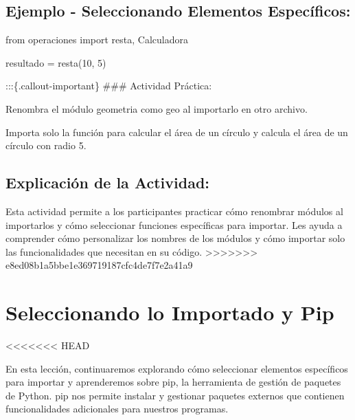 \documentclass[
  a4paper,
  DIV=11,
  numbers=noendperiod,
  onepage,
  openany]{scrreprt}
\newenvironment{Shaded}{\begin{snugshade}}{\end{snugshade}}
\newcommand{\DecValTok}[1]{\textcolor[rgb]{0.68,0.00,0.00}{#1}}
\newcommand{\ImportTok}[1]{\textcolor[rgb]{0.00,0.46,0.62}{#1}}
\newcommand{\NormalTok}[1]{\textcolor[rgb]{0.00,0.23,0.31}{#1}}
\newcommand{\OperatorTok}[1]{\textcolor[rgb]{0.37,0.37,0.37}{#1}}
\begin{document}
\hypertarget{ejemplo---seleccionando-elementos-especuxedficos-1}{%
\section{Ejemplo - Seleccionando Elementos
Específicos:}\label{ejemplo---seleccionando-elementos-especuxedficos-1}}

\begin{Shaded}
\begin{Highlighting}[]
\ImportTok{from}\NormalTok{ operaciones }\ImportTok{import}\NormalTok{ resta, Calculadora}

\NormalTok{resultado }\OperatorTok{=}\NormalTok{ resta(}\DecValTok{10}\NormalTok{, }\DecValTok{5}\NormalTok{)}
\end{Highlighting}
\end{Shaded}

:::\{.callout-important\} \#\#\# Actividad Práctica:

Renombra el módulo geometria como geo al importarlo en otro archivo.

Importa solo la función para calcular el área de un círculo y calcula el
área de un círculo con radio 5.

\hypertarget{explicaciuxf3n-de-la-actividad-61}{%
\section{Explicación de la
Actividad:}\label{explicaciuxf3n-de-la-actividad-61}}

Esta actividad permite a los participantes practicar cómo renombrar
módulos al importarlos y cómo seleccionar funciones específicas para
importar. Les ayuda a comprender cómo personalizar los nombres de los
módulos y cómo importar solo las funcionalidades que necesitan en su
código.
\textgreater\textgreater\textgreater\textgreater\textgreater\textgreater\textgreater{}
e8ed08b1a5bbe1e369719187cfc4de7f7e2a41a9

\hypertarget{seleccionando-lo-importado-y-pip}{%
\chapter{Seleccionando lo Importado y
Pip}\label{seleccionando-lo-importado-y-pip}}

\textless\textless\textless\textless\textless\textless\textless{} HEAD

En esta lección, continuaremos explorando cómo seleccionar elementos
específicos para importar y aprenderemos sobre pip, la herramienta de
gestión de paquetes de Python. pip nos permite instalar y gestionar
paquetes externos que contienen funcionalidades adicionales para
nuestros programas.
\end{document}
